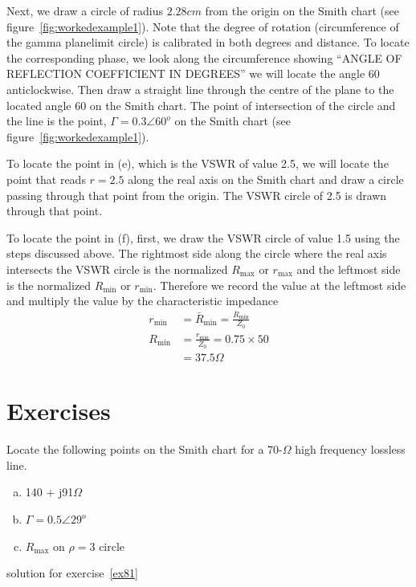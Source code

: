 \begin{exmp}
Next, we draw a circle of radius $2.28cm$ from the origin on the Smith chart (see figure~\ref{fig:workedexample1}). Note that the degree of rotation (circumference of the gamma plane\textemdash limit circle) is calibrated in both degrees and distance. To locate the corresponding phase, we look along the circumference showing \textquotedblleft ANGLE OF REFLECTION COEFFICIENT IN DEGREES\textquotedblright\; we will locate the angle 60\textdegree\; anticlockwise. Then draw a straight line through the centre of the plane to the located angle 60\textdegree\; on the Smith chart. The point of intersection of the circle and the line is the point, $\Gamma = 0.3\angle60^o$ on the Smith chart (see figure~\ref{fig:workedexample1}).

To locate the point in (e), which is the VSWR of value 2.5, we will locate the point that reads $r = 2.5$ along the real axis on the Smith chart and draw a circle passing through that point from the origin. The VSWR circle of 2.5 is drawn through that point.

To locate the point in (f), first, we draw the VSWR circle of value 1.5 using the steps discussed above. The rightmost side along the circle where the real axis intersects the VSWR circle is the normalized $R_\max$ or $r_\max$ and the leftmost side is the normalized $R_\min$ or $r_\min$. Therefore we record the value at the leftmost side and multiply the value by the characteristic impedance
\begin{align*}
r_\min &= \bar{R}_\min = \frac{R_\min}{Z_0}\\
R_\min &= \frac{r_\min}{Z_0} = 0.75 \times 50\\
&= 37.5\Omega
\end{align*}
\end{exmp}

\section*{Exercises}
\begin{ExerciseList}
\Exercise[label={ex81}] Locate the following points on the Smith chart for a 70-$\varOmega$ high frequency lossless line.
\begin{enumerate}[(a)]
\item 140 + j91$\varOmega$
\item $\Gamma=0.5\angle29^o$
\item $R_\max$ on $\rho = 3$ circle
\end{enumerate}
\Answer[ref={ex81}]
solution for exercise~\ref{ex81}
\end{ExerciseList}